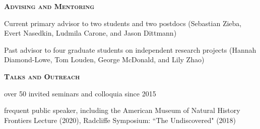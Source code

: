 \documentclass[12pt,letterpaper]{article}
\begin{document}
\textbf{\textsc{Advising and Mentoring}} 
\begin{compactitem}
\item Current primary advisor to two students and two postdocs (Sebastian Zieba, Evert Nasedkin, Ludmila Carone, and Jason Dittmann)
\item Past advisor to four graduate students on independent research projects (Hannah Diamond-Lowe, Tom Louden, George McDonald, and Lily Zhao)
\end{compactitem}

\vspace{7mm}

\textbf{\textsc{Talks and Outreach}} 
\begin{compactitem}
\item over 50 invited seminars and colloquia since 2015 
\item frequent public speaker, including the
    American Museum of Natural History Frontiers Lecture (2020), Radcliffe Symposium: ``The Undiscovered" (2018)
\end{compactitem}
\end{document}
